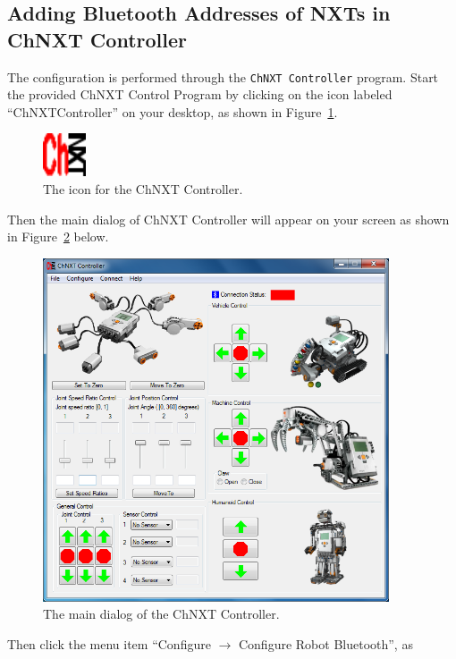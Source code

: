 \documentclass[11pt]{article}
\begin{document}
\subsection{Adding Bluetooth Addresses of NXTs in ChNXT Controller}
The configuration is performed through the {\tt ChNXT Controller} program. Start 
the provided ChNXT Control Program by clicking on the icon labeled ``ChNXTController'' 
on your desktop, as shown in Figure~\ref{fig:chnxt_icon}.
\begin{figure}[H]
  \begin{center}
    \includegraphics[height=0.5in]{figure/configuration/chnxt.png}
    \caption{The icon for the ChNXT Controller.\label{fig:chnxt_icon}}
  \end{center}
\end{figure}
Then the main dialog of ChNXT Controller will appear on your screen as shown in 
Figure~\ref{fig:main_dialog} below.
\begin{figure}[H]
  \begin{center}
    \includegraphics[height=4in]{figure/configuration/mainDlg.png}
    \caption{The main dialog of the ChNXT Controller.\label{fig:main_dialog}}
  \end{center}
\end{figure}
Then click the menu item ``Configure $\rightarrow$ Configure Robot Bluetooth'', as 
\end{document}
